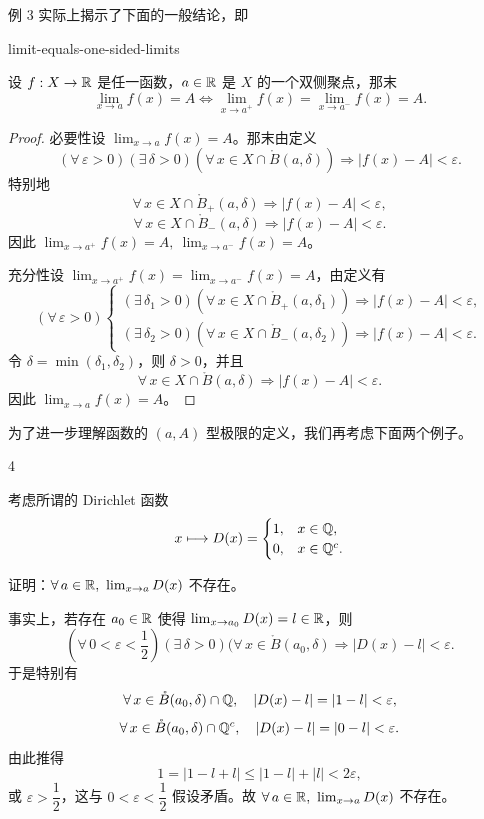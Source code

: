 例 3 实际上揭示了下面的一般结论，即

\begin{mythm}{}{limit-equals-one-sided-limits}

	设 \(f:X\to\mathbb{R}\) 是任一函数，\(a\in\mathbb{R}\) 是 \(X\) 的一个双侧聚点，那末
	\[
	\lim_{x\to a}f(x)=A \Longleftrightarrow \lim_{x\to a^+}f(x)=\lim_{x\to a^-}f(x)=A.
	\]

\end{mythm}

\begin{proof}

	必要性\quad 设 \(\lim_{x\to a}f(x)=A\)。那末由定义
	\[
	(\forall\,\varepsilon>0)(\exists\,\delta>0)(\forall\,x\in X\cap\mathring{B}(a,\delta))\Longrightarrow |f(x)-A|<\varepsilon.
	\]
	特别地
	\[
	\forall\,x\in X\cap\mathring{B}_+(a,\delta)\Longrightarrow |f(x)-A|<\varepsilon,
	\]
	\[
	\forall\,x\in X\cap\mathring{B}_-(a,\delta)\Longrightarrow |f(x)-A|<\varepsilon.
	\]
	因此 \(\lim_{x\to a^+}f(x)=A,\ \lim_{x\to a^-}f(x)=A\)。

	充分性\quad 设 \(\lim_{x\to a^+}f(x)=\lim_{x\to a^-}f(x)=A\)，由定义有
	\[
	(\forall\,\varepsilon>0)\begin{cases}
	(\exists\,\delta_1>0)(\forall\,x\in X\cap\mathring{B}_+(a,\delta_1))\Longrightarrow |f(x)-A|<\varepsilon, \\
	(\exists\,\delta_2>0)(\forall\,x\in X\cap\mathring{B}_-(a,\delta_2))\Longrightarrow |f(x)-A|<\varepsilon.
	\end{cases}
	\]
	令 \(\delta=\min(\delta_1,\delta_2)\)，则 \(\delta>0\)，并且
	\[
	\forall\,x\in X\cap\mathring{B}(a,\delta)\Longrightarrow |f(x)-A|<\varepsilon.
	\]
	因此 \(\lim_{x\to a}f(x)=A\)。

\end{proof}

为了进一步理解函数的 \((a,A)\) 型极限的定义，我们再考虑下面两个例子。

\begin{sourceexample}{4}

	考虑所谓的 Dirichlet 函数
	\[
	x\longmapsto D(x)=\begin{cases} 1, & x\in\mathbb{Q}, \\ 0, & x\in\mathbb{Q}^c. \end{cases}
	\]

	证明：\(\forall\,a\in\mathbb{R},\ \lim_{x\to a}D(x)\) 不存在。

	事实上，若存在 \(a_0\in\mathbb{R}\) 使得 \(\lim_{x\to a_0}D(x)=l\in\mathbb{R}\)，则
	\[
	\left(\forall\,0<\varepsilon<\frac12\right)(\exists\,\delta>0)(\forall\,x\in\mathring{B}(a_0,\delta)\Longrightarrow|D(x)-l|<\varepsilon.
	\]
	于是特别有
	\[
	\forall\,x\in\mathring{B}(a_0,\delta)\cap\mathbb{Q},\quad |D(x)-l|=|1-l|<\varepsilon,
	\]
	\[
	\forall\,x\in\mathring{B}(a_0,\delta)\cap\mathbb{Q}^c,\quad |D(x)-l|=|0-l|<\varepsilon.
	\]
	由此推得
	\[
	1=|1-l+l|\le|1-l|+|l|<2\varepsilon,
	\]
	或 \(\varepsilon>\dfrac12\)，这与 \(0<\varepsilon<\dfrac12\) 假设矛盾。故 \(\forall\,a\in\mathbb{R},\ \lim_{x\to a}D(x)\) 不存在。

\end{sourceexample}

